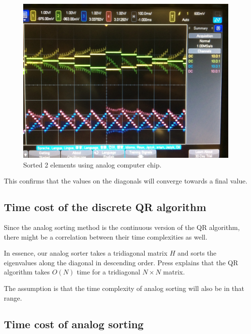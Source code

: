 \begin{figure}[h]
\centering
\includegraphics[width=\columnwidth]{graphics/2d_analog.jpg}
\caption{Sorted 2 elements using analog computer chip.}
\end{figure}

This confirms that the values on the diagonals will converge towards a final value.


\subsection{Time cost of the discrete QR algorithm}
Since the analog sorting method is the continuous version of the QR algorithm, there might be a correlation between their time complexities as well. 

In essence, our analog sorter takes a tridiagonal matrix $H$ and sorts the eigenvalues along the diagonal in descending order. Press explains that the QR algorithm takes $O(N)$ time for a tridiagonal $N\times N$ matrix. 

The assumption is that the time complexity of analog sorting will also be in that range.


\subsection{Time cost of analog sorting}

